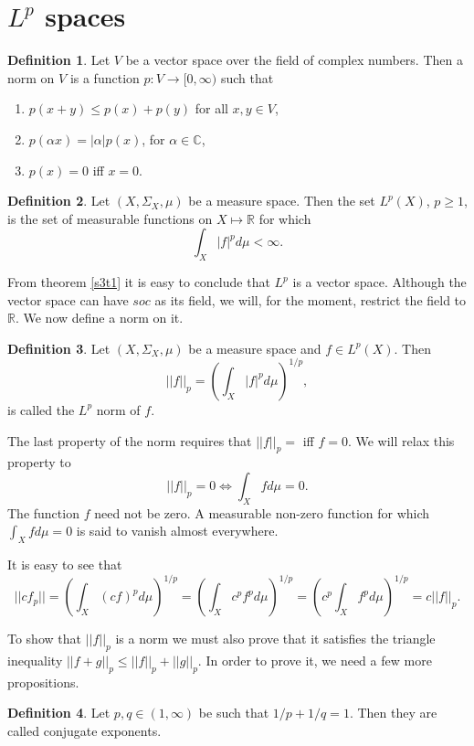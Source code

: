 \documentclass{article}
\newcommand{\soc}{\mathbb{C}}
\newcommand{\sor}{\mathbb{R}}
\theoremstyle{plain}
\numberwithin{thm}{section}
\theoremstyle{plain}
\numberwithin{prop}{section}
\theoremstyle{definition}
\newtheorem{defn}{Definition}
\numberwithin{defn}{section}
\theoremstyle{remark}
\theoremstyle{plain}
\numberwithin{cor}{section}
\numberwithin{equation}{section}
\begin{document}
\section{$L^p$ spaces}\label{s5}
\begin{defn}\label{s5d1}Let $V$ be a vector space over the field of 
complex numbers. Then a norm on $V$ is a function $p: V \rightarrow 
[0, \infty)$ such that
\begin{enumerate}
\item $p(x + y) \le p(x) + p(y)$ for all $x, y \in V$,
\item $p(\alpha x) = |\alpha|p(x)$, for $\alpha \in \soc$,
\item $p(x) = 0$ iff $x = 0$.
\end{enumerate}
\end{defn}

\begin{defn}\label{s5d2}
Let $(X, \Sigma_X, \mu)$ be a measure space. Then the set $L^p(X)$, $p \ge
1$, is the set of measurable functions on $X \mapsto \sor$ for which
\[
\int_X |f|^p d\mu < \infty.
\]
\end{defn}

From theorem \ref{s3t1} it is easy to conclude that $L^p$ is a vector
space. Although the vector space can have $soc$ as its field, we will, for
the moment, restrict the field to $\sor$. We now define a norm on it.
\begin{defn}\label{s2d2}
Let $(X, \Sigma_X, \mu)$ be a measure space and $f \in L^p(X)$. Then
\[
||f||_p = \left(\int_X |f|^p d\mu\right)^{1/p},
\]
is called the $L^p$ norm of $f$.
\end{defn}
The last property of the norm requires that $||f||_p = $ iff $f = 0$.
We will relax this property to
\begin{equation}\label{s5e1}
||f||_p = 0 \Leftrightarrow \int_X fd\mu = 0.
\end{equation}
The function $f$ need not be zero. A measurable non-zero function for 
which $\int_X fd\mu = 0$ is said to vanish almost everywhere. 

It is easy to see that
\[
||cf_p|| = \left(\int_X (cf)^p d\mu\right)^{1/p} =
\left(\int_X c^p f^p d\mu\right)^{1/p} = 
\left(c^p \int_X f^p d\mu\right)^{1/p} = c||f||_p.
\]

To show that $||f||_p$ is a norm we must also prove that it satisfies
the triangle inequality $||f + g||_p \le ||f||_p + ||g||_p$. In order
to prove it, we need a few more propositions.

\begin{defn}
Let $p, q \in (1, \infty)$ be such that $1/p + 1/q = 1$. Then they are
called conjugate exponents.
\end{defn}
\end{document}
